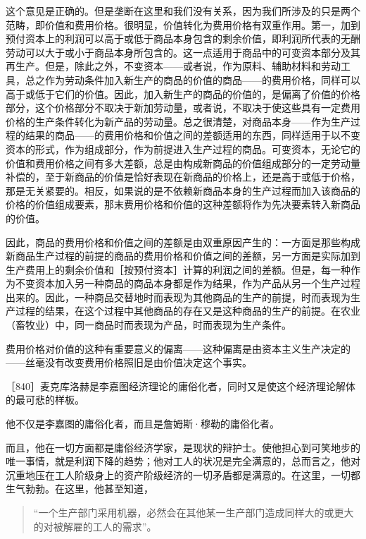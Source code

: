 这个意见是正确的。但是垄断在这里和我们没有关系，因为我们所涉及的只是两个范畴，即价值和费用价格。很明显，价值转化为费用价格有双重作用。第一，加到预付资本上的利润可以高于或低于商品本身包含的剩余价值，即利润所代表的无酬劳动可以大于或小于商品本身所包含的。这一点适用于商品中的可变资本部分及其再生产。但是，除此之外，不变资本——或者说，作为原料、辅助材料和劳动工具，总之作为劳动条件加入新生产的商品的价值的商品——的费用价格，同样可以高于或低于它们的价值。因此，加入新生产的商品的价值的，是偏离了价值的价格部分，这个价格部分不取决于新加劳动量，或者说，不取决于使这些具有一定费用价格的生产条件转化为新产品的劳动量。总之很清楚，对商品本身——作为生产过程的结果的商品——的费用价格和价值之间的差额适用的东西，同样适用于以不变资本的形式，作为组成部分，作为前提进入生产过程的商品。可变资本，无论它的价值和费用价格之间有多大差额，总是由构成新商品的价值组成部分的一定劳动量补偿的，至于新商品的价值是恰好表现在新商品的价格上，还是高于或低于价格，那是无关紧要的。相反，如果说的是不依赖新商品本身的生产过程而加入该商品的价格的价值组成要素，那末费用价格和价值的这种差额将作为先决要素转入新商品的价值。

因此，商品的费用价格和价值之间的差额是由双重原因产生的：一方面是那些构成新商品生产过程的前提的商品的费用价格和价值之间的差额，另一方面是实际加到生产费用上的剩余价值和［按预付资本］计算的利润之间的差额。但是，每一种作为不变资本加入另一种商品的商品本身都是作为结果，作为产品从另一个生产过程出来的。因此，一种商品交替地时而表现为其他商品的生产的前提，时而表现为生产过程的结果，在这个过程中其他商品的存在又是这种商品的生产的前提。在农业（畜牧业）中，同一商品时而表现为产品，时而表现为生产条件。

费用价格对价值的这种有重要意义的偏离——这种偏离是由资本主义生产决定的——丝毫没有改变费用价格照旧是由价值决定这个事实。



［840］麦克库洛赫是李嘉图经济理论的庸俗化者，同时又是使这个经济理论解体的最可悲的样板。

他不仅是李嘉图的庸俗化者，而且是詹姆斯·穆勒的庸俗化者。

而且，他在一切方面都是庸俗经济学家，是现状的辩护士。使他担心到可笑地步的唯一事情，就是利润下降的趋势；他对工人的状况是完全满意的，总而言之，他对沉重地压在工人阶级身上的资产阶级经济的一切矛盾都是满意的。在这里，一切都生气勃勃。在这里，他甚至知道，

\begin{quote}{“一个生产部门采用机器，必然会在其他某一生产部门造成同样大的或更大的对被解雇的工人的需求”。}\end{quote}

